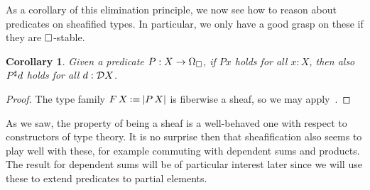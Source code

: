 \documentclass[11pt]{article}
\newtheorem{coro}[thrm]{Corollary}
\begin{document}
As a corollary of this elimination principle, we now see how to reason
about predicates on sheafified types.
%
In particular, we only have a good grasp on these if they are
\(\Box\)-stable.

\begin{coro}
  Given a predicate \(P : X \to \Omega_\Box\), if \(P x\) holds for all \(x : X\),
  then also \({P}^\sharp d\) holds for all \(d : \mathcal{D}{X}\).
\end{coro}
\begin{proof}
  The type family
  \(F\,X \mathbin{\vcentcolon\equiv} |{P\,X}|\) is fiberwise a sheaf, so we may
  apply~.
\end{proof}

As we saw, the property of being a sheaf is a well-behaved one with respect
to constructors of type theory.
%
It is no surprise then that sheafification also seems to play well with these,
for example commuting with dependent sums and products.
%
The result for dependent sums will be of particular interest later since
we will use these to extend predicates to partial elements.
\end{document}
